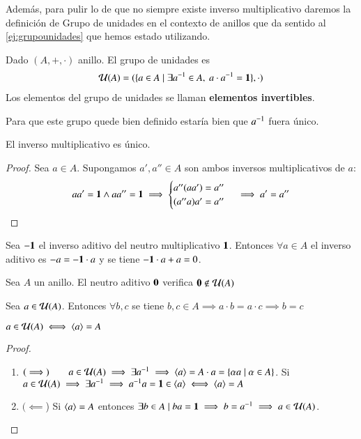 Además, para pulir lo de que no siempre existe inverso multiplicativo daremos la definición de Grupo de unidades en el contexto de anillos que da sentido al \autoref{ej:grupounidades} que hemos estado utilizando.

\begin{dfn}
	Dado $(A, +, \cdot)$ anillo. El grupo de unidades es
	\begin{align}
		\mathcal{U}(A) = (\{a \in A \mid \exists a^{-1} \in A,\ a\cdot a^{-1} = \mathbf{1}\}, \cdot)
	\end{align}
	Los elementos del grupo de unidades se llaman \textbf{elementos invertibles}.
\end{dfn}

Para que este grupo quede bien definido estaría bien que $a^{-1}$ fuera único.

\begin{pro}
	El inverso multiplicativo es único.
\end{pro}

\begin{proof}
	Sea $a \in A$. Supongamos $a', a'' \in A$ son ambos inversos multiplicativos de $a$:
	\begin{align*}
		aa' = \mathbf{1} \land aa'' = \mathbf{1}\implies \begin{cases}
		a''(aa') = a'' \\
		(a''a)a' = a''
		\end{cases}\implies a' = a''
	\end{align*}
\end{proof}

\begin{pro}
	Sea $-\mathbf{1}$ el inverso aditivo del neutro multiplicativo $\mathbf{1}$. Entonces $\forall a \in A$ el inverso aditivo es $-a = -\mathbf{1} \cdot a$ y se tiene $-\mathbf{1}\cdot a + a = 0$.
\end{pro}

\begin{pro}
	Sea $A$ un anillo. El neutro aditivo $\mathbf{0}$ verifica $\mathbf{0} \not\in \mathcal{U}(A)$
\end{pro}

\begin{pro}
	Sea $a \in \mathcal{U}(A)$. Entonces $\forall b,c$ se tiene $b, c \in A \implies a\cdot b = a\cdot c \implies b = c$
\end{pro}

\begin{pro}
	$a \in \mathcal{U}(A) \iff \langle a\rangle = A$
\end{pro}

\begin{proof}$ $\newline
	\begin{enumerate}
		\item $(\implies)\qquad a \in \mathcal{U}(A) \implies \exists a^{-1} \implies \langle a\rangle = A\cdot a = \{\alpha a \mid \alpha \in A\}$. Si $a \in \mathcal{U}(A) \implies \exists a^{-1} \implies a^{-1}a = \mathbf{1} \in \langle a\rangle \iff \langle a\rangle = A$
		
		\item $(\impliedby$) Si $\langle a\rangle = A$ entonces $\exists b \in A \mid ba = \mathbf{1} \implies b = a^{-1} \implies a \in \mathcal{U}(A)$.
	\end{enumerate}
\end{proof}

